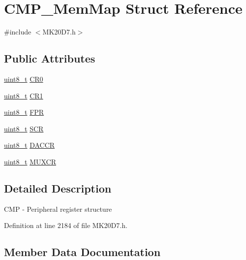 \hypertarget{struct_c_m_p___mem_map}{}\section{C\+M\+P\+\_\+\+Mem\+Map Struct Reference}
\label{struct_c_m_p___mem_map}


{\ttfamily \#include $<$M\+K20\+D7.\+h$>$}

\subsection*{Public Attributes}
\begin{DoxyCompactItemize}
\item 
\hyperlink{_p_e___types_8h_aba7bc1797add20fe3efdf37ced1182c5}{uint8\+\_\+t} \hyperlink{struct_c_m_p___mem_map_ad56a4dbaba4426c89e4d9b256173ab84}{C\+R0}
\item 
\hyperlink{_p_e___types_8h_aba7bc1797add20fe3efdf37ced1182c5}{uint8\+\_\+t} \hyperlink{struct_c_m_p___mem_map_ab790f5d18ef53ba0c9cfc2b5f3ce6668}{C\+R1}
\item 
\hyperlink{_p_e___types_8h_aba7bc1797add20fe3efdf37ced1182c5}{uint8\+\_\+t} \hyperlink{struct_c_m_p___mem_map_aa793447f43fa77759b6eaf1620bed4bc}{F\+PR}
\item 
\hyperlink{_p_e___types_8h_aba7bc1797add20fe3efdf37ced1182c5}{uint8\+\_\+t} \hyperlink{struct_c_m_p___mem_map_a3fe55f0243869b50fc54acb9c194d970}{S\+CR}
\item 
\hyperlink{_p_e___types_8h_aba7bc1797add20fe3efdf37ced1182c5}{uint8\+\_\+t} \hyperlink{struct_c_m_p___mem_map_a64ad86546fe53058b6fdd5ca1252f7c2}{D\+A\+C\+CR}
\item 
\hyperlink{_p_e___types_8h_aba7bc1797add20fe3efdf37ced1182c5}{uint8\+\_\+t} \hyperlink{struct_c_m_p___mem_map_a3b48de300c4b4116ebb942659a2948a2}{M\+U\+X\+CR}
\end{DoxyCompactItemize}


\subsection{Detailed Description}
C\+MP -\/ Peripheral register structure 

Definition at line 2184 of file M\+K20\+D7.\+h.



\subsection{Member Data Documentation}
